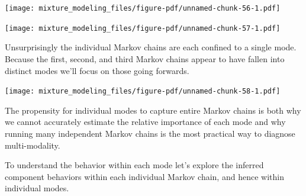 \documentclass[
  letterpaper,
  DIV=11,
  numbers=noendperiod]{scrartcl}
\newenvironment{Shaded}{\begin{snugshade}}{\end{snugshade}}
\newcommand{\ControlFlowTok}[1]{\textcolor[rgb]{0.00,0.23,0.31}{#1}}
\newcommand{\DecValTok}[1]{\textcolor[rgb]{0.68,0.00,0.00}{#1}}
\newcommand{\FunctionTok}[1]{\textcolor[rgb]{0.28,0.35,0.67}{#1}}
\newcommand{\NormalTok}[1]{\textcolor[rgb]{0.00,0.23,0.31}{#1}}
\newcommand{\OtherTok}[1]{\textcolor[rgb]{0.00,0.23,0.31}{#1}}
\newcommand{\SpecialCharTok}[1]{\textcolor[rgb]{0.37,0.37,0.37}{#1}}
\newcommand{\StringTok}[1]{\textcolor[rgb]{0.13,0.47,0.30}{#1}}
\begin{document}
\texttt{[image: mixture\_modeling\_files/figure-pdf/unnamed-chunk-56-1.pdf]}

\begin{Shaded}
\end{Shaded}

\texttt{[image: mixture\_modeling\_files/figure-pdf/unnamed-chunk-57-1.pdf]}

Unsurprisingly the individual Markov chains are each confined to a
single mode. Because the first, second, and third Markov chains appear
to have fallen into distinct modes we'll focus on those going forwards.

\begin{Shaded}
\end{Shaded}

\texttt{[image: mixture\_modeling\_files/figure-pdf/unnamed-chunk-58-1.pdf]}

The propensity for individual modes to capture entire Markov chains is
both why we cannot accurately estimate the relative importance of each
mode and why running many independent Markov chains is the most
practical way to diagnose multi-modality.

To understand the behavior within each mode let's explore the inferred
component behaviors within each individual Markov chain, and hence
within individual modes.
\end{document}
